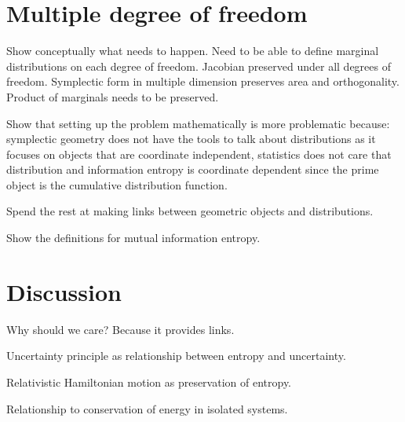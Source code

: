 \documentclass[aps,pra,10pt,twocolumn,floatfix,nofootinbib]{revtex4-1}
\begin{document}
\section{Multiple degree of freedom}

Show conceptually what needs to happen. Need to be able to define marginal distributions on each degree of freedom. Jacobian preserved under all degrees of freedom. Symplectic form in multiple dimension preserves area and orthogonality. Product of marginals needs to be preserved.

Show that setting up the problem mathematically is more problematic because: symplectic geometry does not have the tools to talk about distributions as it focuses on objects that are coordinate independent, statistics does not care that distribution and information entropy is coordinate dependent since the prime object is the cumulative distribution function.

Spend the rest at making links between geometric objects and distributions.

Show the definitions for mutual information entropy.

\section{Discussion}

Why should we care? Because it provides links.

Uncertainty principle as relationship between entropy and uncertainty.

Relativistic Hamiltonian motion as preservation of entropy.

Relationship to conservation of energy in isolated systems.

\begin{thebibliography}{0}
	
\end{thebibliography}
\end{document}
